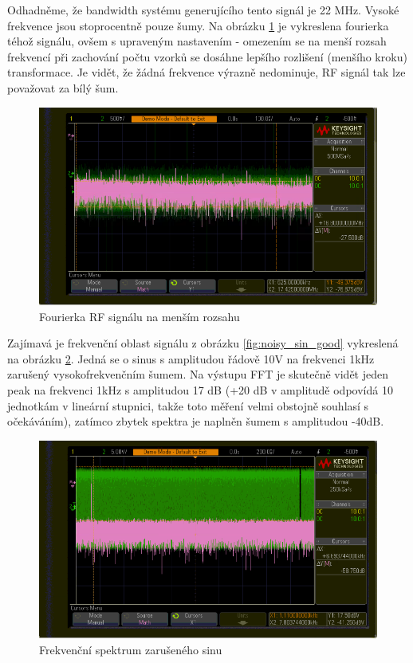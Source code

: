 \documentclass[twoside]{article}
\begin{document}
Odhadněme, že bandwidth systému generujícího tento signál je 22 MHz. Vysoké frekvence jsou stoprocentně pouze šumy. Na obrázku \ref{fig:fft_bandwidth}
je vykreslena fourierka téhož signálu, ovšem s upraveným nastavením - omezením se na menší rozsah frekvencí při zachování počtu vzorků se dosáhne lepšího rozlišení 
(menšího kroku) transformace. Je vidět, že žádná frekvence výrazně nedominuje, RF signál tak lze považovat za bílý šum. 

\begin{figure}[htbp]
	\centering

	\includegraphics[width=0.8\linewidth]{rf_fft_bandwidth.png         }
	\caption{Fourierka RF signálu na menším rozsahu}
	\label{fig:fft_bandwidth}
\end{figure}	



Zajímavá je frekvenční oblast signálu z obrázku \ref{fig:noisy_sin_good} vykreslená na obrázku \ref{fig:fft_noisy}.
Jedná se o sinus s amplitudou řádově 10V na frekvenci 1kHz zarušený vysokofrekvenčním šumem.
Na výstupu FFT je skutečně vidět jeden peak na frekvenci 1kHz s amplitudou 17 dB (+20 dB v amplitudě odpovídá 10 jednotkám v lineární stupnici, takže toto měření velmi obstojně
souhlasí s očekáváním), zatímco zbytek spektra je naplněn šumem s amplitudou -40dB.

\begin{figure}[htbp]
	\centering
	\includegraphics[width=0.8\linewidth]{noisy_sinus_fft.png         }
	\caption{Frekvenční spektrum zarušeného sinu}
	\label{fig:fft_noisy}
\end{figure}	
\end{document}
